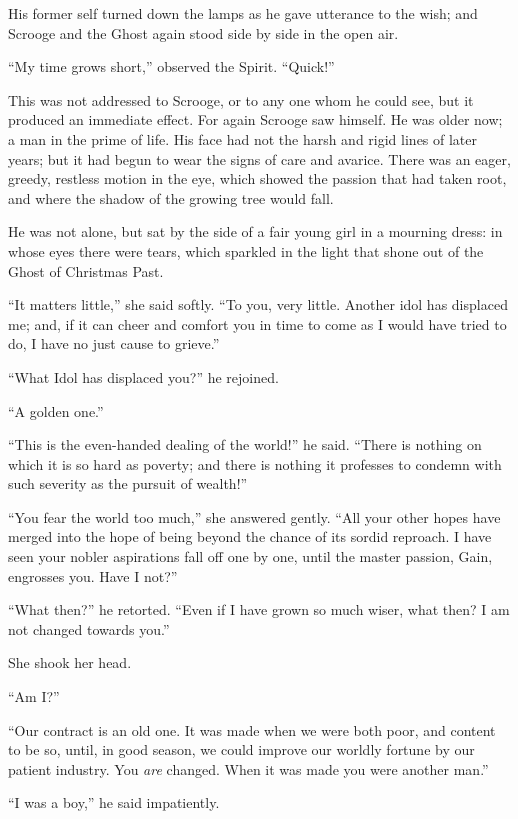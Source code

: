\documentclass[paper=5.5in:8.5in,BCOR=15mm,twoside,DIV=15,headinclude=off,12pt,chapterprefix=off,openany,headings=huge]{scrbook} %
\begin{document}
His former self turned down the lamps as he gave utterance to the wish; and Scrooge and the Ghost again stood side by side in the open air.

\enquote{My time grows short,} observed the Spirit. \enquote{Quick!}

This was not addressed to Scrooge, or to any one whom he could see, but it produced an immediate effect. For again Scrooge saw himself. He was older now; a man in the prime of life. His face had not the harsh and rigid lines of later years; but it had begun to wear the signs of care and avarice. There was an eager, greedy, restless motion in the eye, which showed the passion that had taken root, and where the shadow of the growing tree would fall.

He was not alone, but sat by the side of a fair young girl in a mourning dress: in whose eyes there were tears, which sparkled in the light that shone out of the Ghost of Christmas Past.

\enquote{It matters little,} she said softly. \enquote{To you, very little. Another idol has displaced me; and, if it can cheer and comfort you in time to come as I would have tried to do, I have no just cause to grieve.}

\enquote{What Idol has displaced you?} he rejoined.

\enquote{A golden one.}

\enquote{This is the even-handed dealing of the world!} he said. \enquote{There is nothing on which it is so hard as poverty; and there is nothing it professes to condemn with such severity as the pursuit of wealth!}

\enquote{You fear the world too much,} she answered gently. \enquote{All your other hopes have merged into the hope of being beyond the chance of its sordid reproach. I have seen your nobler aspirations fall off one by one, until the master passion, Gain, engrosses you. Have I not?}

\enquote{What then?} he retorted. \enquote{Even if I have grown so much wiser, what then? I am not changed towards you.}

She shook her head.

\enquote{Am I?}

\enquote{Our contract is an old one. It was made when we were both poor, and content to be so, until, in good season, we could improve our worldly fortune by our patient industry. You \textit{are} changed. When it was made you were another man.}

\enquote{I was a boy,} he said impatiently.
\end{document}
